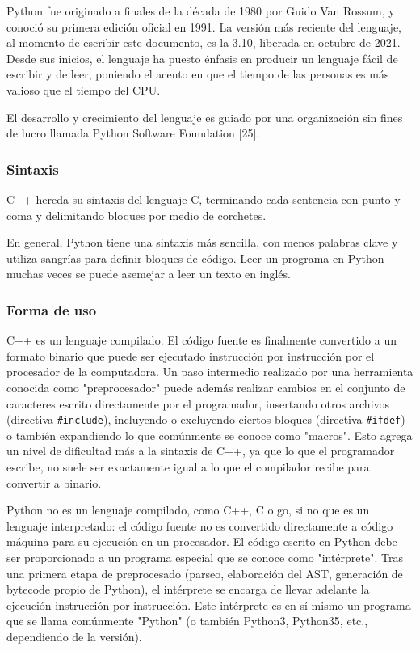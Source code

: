 \documentclass[]{article}
\begin{document}
Python fue originado a finales de la década de 1980 por Guido Van Rossum, y
conoció su primera edición oficial en 1991. La versión más reciente del
lenguaje, al momento de escribir este documento, es la 3.10, liberada en
octubre de 2021. Desde sus inicios, el lenguaje ha puesto énfasis en producir
un lenguaje fácil de escribir y de leer, poniendo el acento en que el tiempo de
las personas es más valioso que el tiempo del CPU.

El desarrollo y crecimiento del lenguaje es guiado por una organización sin
fines de lucro llamada Python Software Foundation [25].

\subsubsection{Sintaxis}

C++ hereda su sintaxis del lenguaje C, terminando cada sentencia con punto y
coma y delimitando bloques por medio de corchetes. 

En general, Python tiene una sintaxis más sencilla, con menos palabras clave y
utiliza sangrías para definir bloques de código. Leer un programa en Python
muchas veces se puede asemejar a leer un texto en inglés.

\subsubsection{Forma de uso}

C++ es un lenguaje compilado. El código fuente es finalmente convertido a un
formato binario que puede ser ejecutado instrucción por instrucción por el
procesador de la computadora. Un paso intermedio realizado por una herramienta
conocida como "preprocesador" puede además realizar cambios en el conjunto de
caracteres escrito directamente por el programador, insertando otros archivos
(directiva \verb!#include!), incluyendo o excluyendo ciertos bloques (directiva
\verb!#ifdef!) o también expandiendo lo que comúnmente se conoce como "macros".
Esto agrega un nivel de dificultad más a la sintaxis de C++, ya que lo que el
programador escribe, no suele ser exactamente igual a lo que el compilador
recibe para convertir a binario.

Python no es un lenguaje compilado, como C++, C o go, si no que es un lenguaje
interpretado: el código fuente no es convertido directamente a código máquina
para su ejecución en un procesador. El código escrito en Python debe ser
proporcionado a un programa especial que se conoce como "intérprete". Tras una
primera etapa de preprocesado (parseo, elaboración del AST, generación de
bytecode propio de Python), el intérprete se encarga de llevar adelante la
ejecución instrucción por instrucción. Este intérprete es en sí mismo un
programa que se llama comúnmente "Python" (o  también Python3, Python35, etc.,
dependiendo de la versión).
\end{document}
